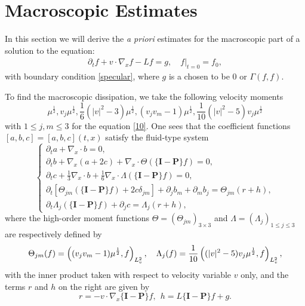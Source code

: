 \documentclass[reqno,a4paper]{amsart}
\numberwithin{equation}{section}
\newcommand{\1}{\mathbf{1}}
\newcommand{\R}{\mathbb{R}}
\renewcommand{\P}{\mathbf{P}}
\newcommand{\dis}{\displaystyle}
\newcommand{\pa}{\partial}
\newcommand{\na}{\nabla}
\newcommand{\de}{\delta}
\newcommand{\<}{\langle}
\renewcommand{\>}{\rangle}
\newcommand{\T}{\mathbb{T}}
\newcommand{\I}{\mathbf{I}}
\renewcommand{\P}{\mathbf{P}}
\begin{document}
	
	\section{Macroscopic Estimates}\label{Sec3}

In this section we will derive the {\em a priori} estimates for the macroscopic part of a solution to the equation:
	\begin{align}\label{10}
		\partial_t{f}+v\cdot\nabla_x{f} - L {f} = g,\quad f|_{t=0}= f_0, 
	\end{align}
	with boundary condition \eqref{specular}, where $g$ is a chosen to be $0$ or $\Gamma(f,f)$. 



To find the macroscopic dissipation, we take the following velocity moments
\begin{equation*}
	\mu^{\frac{1}{2}}, v_j\mu^{\frac{1}{2}}, \frac{1}{6}(|v|^2-3)\mu^{\frac{1}{2}},
	(v_j{v_m}-1)\mu^{\frac{1}{2}}, \frac{1}{10}(|v|^2-5)v_j \mu^{\frac{1}{2}}
\end{equation*}
with {$1\leq j,m\leq 3$} for the equation \eqref{10}. One sees that  
the coefficient functions $[a,b,c]=[a,b,c](t,x)$ satisfy the fluid-type system 
\begin{equation}\label{11}
	\left\{\begin{array}{l}
		\dis \pa_t a +\nabla_x \cdot b=0,\\
		\dis \pa_t b +\na_x (a+2c)+\na_x\cdot \Theta (\{\I-\P\} f)=0,\\[2mm]
		\dis \pa_t c +\frac{1}{3}\na_x\cdot b +\frac{1}{6}\na_x\cdot
		\Lambda (\{\I-\P\} f)=0,\\[2mm]
		\dis \pa_t[\Theta_{{ jm}}(\{\I-\P\} f)+2c\de_{{ jm}}]+\pa_jb_m+\pa_m
		b_j=\Theta_{jm}({r}+{h}),\\[2mm]
		\dis \pa_t \Lambda_j(\{\I-\P\} f)+\pa_j c = \Lambda_j({r}+{h}),
	\end{array}\right.
\end{equation}
where the
high-order moment functions $\Theta=(\Theta_{jm})_{3\times 3}$ and
$\Lambda=(\Lambda_j)_{1\leq j\leq 3}$ are respectively defined by
\begin{equation}
	\Theta_{jm}(f) = \left ((v_jv_m-1)\mu^{\frac{1}{2}}, f\right)_{L^2_v},\ \ \
	\Lambda_j(f)=\frac{1}{10}\left ((|v|^2-5)v_j\mu^{\frac{1}{2}},
	f\right)_{L^2_v},\notag
\end{equation}
with the inner product taken with respect to velocity variable $v$ only, and the terms ${r}$ and ${h}$ on the right are given by
\begin{equation*}
	{r}= -{v}\cdot \na_{{x}} \{\I-\P\}f,\ \ {h}=L \{\I-\P\}f+g.
\end{equation*}
\end{document}
